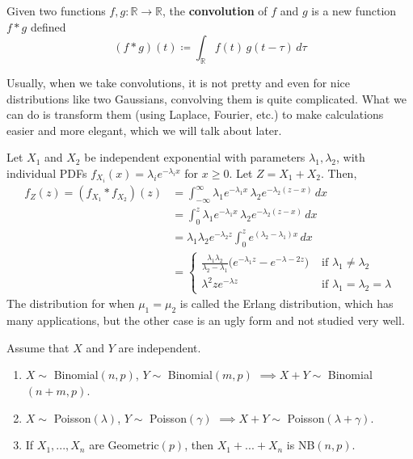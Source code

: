 \documentclass{article}
\begin{document}
      \begin{definition}[Convolution]
        Given two functions $f, g: \mathbb{R} \longrightarrow \mathbb{R}$, the \textbf{convolution} of $f$ and $g$ is a new function $f \ast g$ defined  
        \begin{equation}
          (f \ast g) (t) \coloneqq \int_\mathbb{R} f(t)\, g(t - \tau) \, d \tau
        \end{equation}
      \end{definition}

      Usually, when we take convolutions, it is not pretty and even for nice distributions like two Gaussians, convolving them is quite complicated. What we can do is transform them (using Laplace, Fourier, etc.) to make calculations easier and more elegant, which we will talk about later.  

      \begin{example}
        Let $X_1$ and $X_2$ be independent exponential with parameters $\lambda_1, \lambda_2$, with individual PDFs $f_{X_i} (x) = \lambda_i e^{-\lambda_i x}$ for $x \geq 0$. Let $Z = X_1 + X_2$. Then, 
        \begin{align*}
          f_Z (z) = (f_{X_1} \ast f_{X_2})(z) & = \int_{-\infty}^\infty \lambda_1 e^{-\lambda_1 x} \, \lambda_2 e^{-\lambda_2 (z -x)} \, dx \\
          & = \int_{0}^z \lambda_1 e^{-\lambda_1 x} \, \lambda_2 e^{-\lambda_2 (z -x)} \, dx \\ 
          & = \lambda_1 \lambda_2 e^{-\lambda_2 z} \int_0^z e^{(\lambda_2 - \lambda_1) x}\,dx \\
          & = \begin{cases} \frac{\lambda_1 \lambda_2}{\lambda_2 - \lambda_1} \big( e^{-\lambda_1 z} - e^{-\lambda-2 z} \big) & \text{ if } \lambda_1 \neq \lambda_2 \\
          \lambda^2 z e^{-\lambda z} & \text{ if } \lambda_1 = \lambda_2 = \lambda \end{cases} 
        \end{align*}
        The distribution for when $\mu_1 = \mu_2$ is called the Erlang distribution, which has many applications, but the other case is an ugly form and not studied very well. 
      \end{example}

      \begin{theorem}
        Assume that $X$ and $Y$ are independent. 
        \begin{enumerate}
          \item $X \sim$ Binomial$(n, p)$, $Y \sim$ Binomial$(m, p)$ $\implies X + Y \sim$ Binomial$(n + m, p)$. 
          \item $X \sim$ Poisson$(\lambda)$, $Y \sim$ Poisson$(\gamma)$ $\implies X + Y \sim$ Poisson$(\lambda + \gamma)$. 
          \item If $X_1, ..., X_n$ are Geometric$(p)$, then $X_1 + ... + X_n$ is NB$(n, p)$. 
        \end{enumerate}
      \end{theorem}
\end{document}
